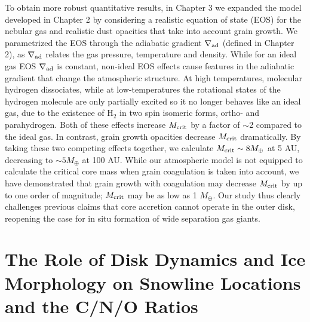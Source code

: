 To obtain more robust quantitative results, in Chapter 3 we expanded the model developed in Chapter 2 by considering a realistic equation of state (EOS) for the nebular gas and realistic dust opacities that take into account grain growth. We parametrized the EOS through the adiabatic gradient $\nabla_{\rm ad}$ (defined in Chapter 2), as $\nabla_{\rm ad}$ relates the gas pressure, temperature and density. While for an ideal gas EOS $\nabla_{\rm ad}$ is constant, non-ideal EOS effects cause features in the adiabatic gradient that change the atmospheric structure. At high temperatures, molecular hydrogen dissociates, while at low-temperatures the rotational states of the hydrogen molecule are only partially excited so it no longer behaves like an ideal gas, due to the existence of H$_2$ in two spin isomeric forms, ortho- and parahydrogen. Both of these effects increase $M_{\rm crit}$ by a factor of $\sim$2 compared to the ideal gas. In contrast, grain growth opacities decrease $M_{\rm crit}$ dramatically. By taking these two competing effects together, we calculate $M_{\rm crit} \sim 8 M_{\oplus}$ at 5 AU, decreasing to $\sim 5 M_{\oplus}$ at 100 AU. While our atmospheric model is not equipped to calculate the critical core mass when grain coagulation is taken into account, we have demonstrated that grain growth with coagulation may decrease $M_{\rm crit}$ by up to one order of magnitude; $M_{\rm crit}$ may be as low as 1 $M_{\oplus}$. Our study thus clearly challenges previous claims that core accretion cannot operate in the outer disk, reopening the case for in situ formation of wide separation gas giants. 

\section{The Role of Disk Dynamics and Ice Morphology on Snowline Locations and the C/N/O Ratios}
\label{sec:volatile}

